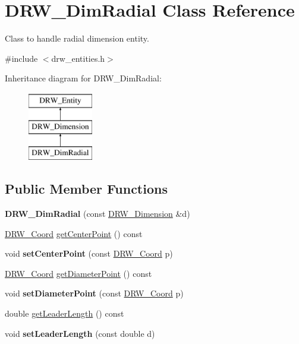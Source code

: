 \hypertarget{classDRW__DimRadial}{\section{D\-R\-W\-\_\-\-Dim\-Radial Class Reference}
\label{classDRW__DimRadial}
}


Class to handle radial dimension entity.  




{\ttfamily \#include $<$drw\-\_\-entities.\-h$>$}

Inheritance diagram for D\-R\-W\-\_\-\-Dim\-Radial\-:\begin{figure}[H]
\begin{center}
\leavevmode
\includegraphics[height=3.000000cm]{classDRW__DimRadial}
\end{center}
\end{figure}
\subsection*{Public Member Functions}
\begin{DoxyCompactItemize}
\item 
\hypertarget{classDRW__DimRadial_af29569280fb288819991282087c6c94e}{{\bfseries D\-R\-W\-\_\-\-Dim\-Radial} (const \hyperlink{classDRW__Dimension}{D\-R\-W\-\_\-\-Dimension} \&d)}\label{classDRW__DimRadial_af29569280fb288819991282087c6c94e}

\item 
\hyperlink{classDRW__Coord}{D\-R\-W\-\_\-\-Coord} \hyperlink{classDRW__DimRadial_a81bb02a4fd5574ac4bd2321ed7936b22}{get\-Center\-Point} () const 
\item 
\hypertarget{classDRW__DimRadial_a46fc18a9062bb945ee8875c7b05d94b4}{void {\bfseries set\-Center\-Point} (const \hyperlink{classDRW__Coord}{D\-R\-W\-\_\-\-Coord} p)}\label{classDRW__DimRadial_a46fc18a9062bb945ee8875c7b05d94b4}

\item 
\hyperlink{classDRW__Coord}{D\-R\-W\-\_\-\-Coord} \hyperlink{classDRW__DimRadial_ac0c68b23a408f7f9c12a8b1d6ef6f4db}{get\-Diameter\-Point} () const 
\item 
\hypertarget{classDRW__DimRadial_a75eb8068d9b92a58dda4b8b200fc76f0}{void {\bfseries set\-Diameter\-Point} (const \hyperlink{classDRW__Coord}{D\-R\-W\-\_\-\-Coord} p)}\label{classDRW__DimRadial_a75eb8068d9b92a58dda4b8b200fc76f0}

\item 
double \hyperlink{classDRW__DimRadial_ab1127a65b14758a780d3e2e4a3b0b102}{get\-Leader\-Length} () const 
\item 
\hypertarget{classDRW__DimRadial_a671bb5e02e00259ef7b8b654dad6197a}{void {\bfseries set\-Leader\-Length} (const double d)}\label{classDRW__DimRadial_a671bb5e02e00259ef7b8b654dad6197a}

\end{DoxyCompactItemize}
